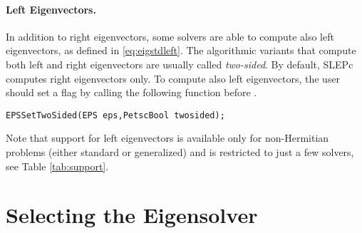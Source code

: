 \paragraph{Left Eigenvectors.}

In addition to right eigenvectors, some solvers are able to compute also left eigenvectors, as defined in \eqref{eq:eigstdleft}. The algorithmic variants that compute both left and right eigenvectors are usually called \emph{two-sided}. By default, SLEPc computes right eigenvectors only. To compute also left eigenvectors, the user should set a flag by calling the following function before .
        \begin{Verbatim}[fontsize=\small]
        EPSSetTwoSided(EPS eps,PetscBool twosided);
        \end{Verbatim}
Note that support for left eigenvectors is available only for non-Hermitian problems (either standard or generalized) and is restricted to just a few solvers, see Table \ref{tab:support}.

\section{Selecting the Eigensolver}

